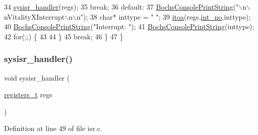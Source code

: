 \begin{DoxyCode}
34             \hyperlink{a00077_abd1fa375737cd5ecd84c082738e3b195_abd1fa375737cd5ecd84c082738e3b195}{sysisr\_handler}(regs);
35             \textcolor{keywordflow}{break};
36         \textcolor{keywordflow}{default}:
37             \hyperlink{a00047_a19e1f554d03c977f8b947f21489daa41_a19e1f554d03c977f8b947f21489daa41}{BochsConsolePrintString}(\textcolor{stringliteral}{"\(\backslash\)n\(\backslash\)nVitalityXInterrupt\(\backslash\)n\(\backslash\)n"});
38             \textcolor{keywordtype}{char}* inttype = \textcolor{stringliteral}{"  "};
39             \hyperlink{a00089_af749add1ff19b6ff96a62f35ebb49b7e_af749add1ff19b6ff96a62f35ebb49b7e}{itoa}(regs.\hyperlink{a00162_af311750a9b18afb3b1ed2d144fbe1cb0_af311750a9b18afb3b1ed2d144fbe1cb0}{int\_no},inttype);
40             \hyperlink{a00047_a19e1f554d03c977f8b947f21489daa41_a19e1f554d03c977f8b947f21489daa41}{BochsConsolePrintString}(\textcolor{stringliteral}{"Interrupt: "});
41             \hyperlink{a00047_a19e1f554d03c977f8b947f21489daa41_a19e1f554d03c977f8b947f21489daa41}{BochsConsolePrintString}(inttype);
42             \textcolor{keywordflow}{for}(;;) \{
43 
44             \}
45             \textcolor{keywordflow}{break};
46     \}
47 \}
\end{DoxyCode}
\mbox{\label{a00077_abd1fa375737cd5ecd84c082738e3b195_abd1fa375737cd5ecd84c082738e3b195}} 
\subsubsection{\texorpdfstring{sysisr\+\_\+handler()}{sysisr\_handler()}}
{\footnotesize\ttfamily void sysisr\+\_\+handler (\begin{DoxyParamCaption}\item[{\hyperlink{a00080_adf58dbaf6139b4957c348711f2026957_adf58dbaf6139b4957c348711f2026957}{registers\+\_\+t}}]{regs }\end{DoxyParamCaption})}



Definition at line 49 of file isr.\+c.


